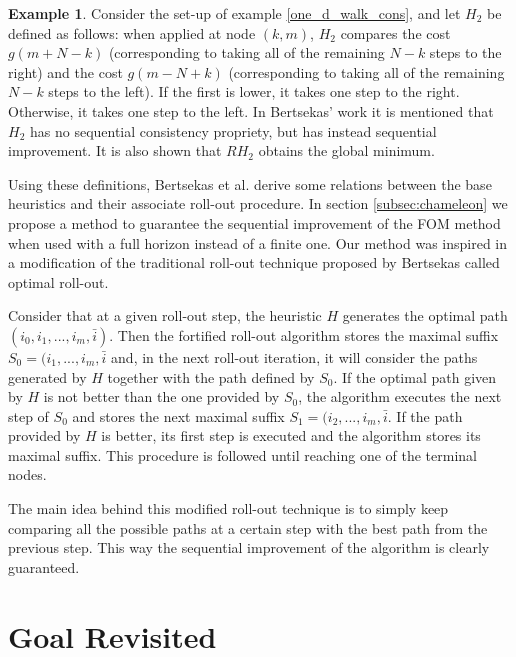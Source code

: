 \documentclass[12,twoside]{TFG-GM}
\theoremstyle{definition}
\newtheorem{example}[theorem]{Example}
\theoremstyle{remark}
\newcommand*\diff[1]{\bar{#1}}
\begin{document}
\begin{example}
Consider the set-up of example \ref{one_d_walk_cons}, and let $H_2$ be defined as follows: when applied at node $(k,m)$, $H_2$ compares the cost $g(m + N - k)$ (corresponding to taking all of the remaining $N - k$ steps to the right) and the cost $g(m - N + k)$ (corresponding to taking all of the remaining $N - k$ steps to the left). If the first is lower, it takes one step to the right. Otherwise, it takes one step to the left. In Bertsekas' work it is mentioned that $H_2$ has no sequential consistency propriety, but has instead sequential improvement. It is also shown that $RH_2$ obtains the global minimum.
\end{example}

Using these definitions, Bertsekas et al. derive some relations between the base heuristics and their associate roll-out procedure. In section \ref{subsec:chameleon} we propose a method to guarantee the sequential improvement of the FOM method when used with a full horizon instead of a finite one. Our method was inspired in a modification of the traditional roll-out technique proposed by Bertsekas called optimal roll-out.

Consider that at a given roll-out step, the heuristic $H$ generates the optimal path $(i_0, i_1,..., i_m, \diff{i})$. Then the fortified roll-out algorithm stores the maximal suffix $S_0 = (i_1, ..., i_m, \diff{i}$ and, in the next roll-out iteration, it will consider the paths generated by $H$ together with the path defined by $S_0$. If the optimal path given by $H$ is not better than the one provided by $S_0$, the algorithm executes the next step of $S_0$ and stores the next maximal suffix $S_1 = (i_2, ..., i_m, \diff{i}$. If the path provided by $H$ is better, its first step is executed and the algorithm stores its maximal suffix. This procedure is followed until reaching one of the terminal nodes.

The main idea behind this modified roll-out technique is to simply keep comparing all the possible paths at a certain step with the best path from the previous step. This way the sequential improvement of the algorithm is clearly guaranteed.

\section{Goal Revisited}
\label{sec:goal_revisited}
\end{document}
